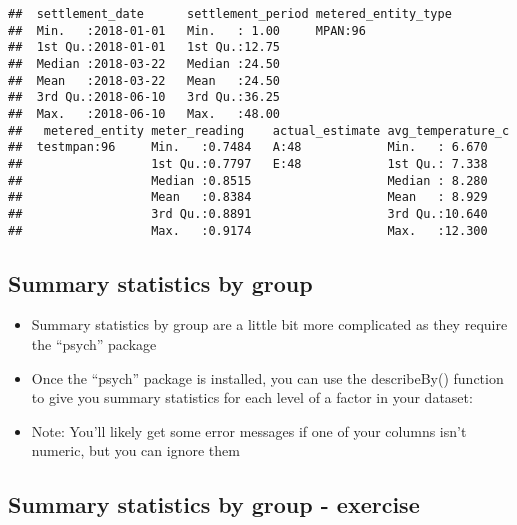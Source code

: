 \documentclass[]{article}
\newenvironment{Shaded}{\begin{snugshade}}{\end{snugshade}}
\newcommand{\KeywordTok}[1]{\textcolor[rgb]{0.13,0.29,0.53}{\textbf{#1}}}
\newcommand{\OperatorTok}[1]{\textcolor[rgb]{0.81,0.36,0.00}{\textbf{#1}}}
\newcommand{\NormalTok}[1]{#1}
\providecommand{\tightlist}{%
  \setlength{\itemsep}{0pt}\setlength{\parskip}{0pt}}
\begin{document}
\begin{verbatim}
##  settlement_date      settlement_period metered_entity_type
##  Min.   :2018-01-01   Min.   : 1.00     MPAN:96            
##  1st Qu.:2018-01-01   1st Qu.:12.75                        
##  Median :2018-03-22   Median :24.50                        
##  Mean   :2018-03-22   Mean   :24.50                        
##  3rd Qu.:2018-06-10   3rd Qu.:36.25                        
##  Max.   :2018-06-10   Max.   :48.00                        
##   metered_entity meter_reading    actual_estimate avg_temperature_c
##  testmpan:96     Min.   :0.7484   A:48            Min.   : 6.670   
##                  1st Qu.:0.7797   E:48            1st Qu.: 7.338   
##                  Median :0.8515                   Median : 8.280   
##                  Mean   :0.8384                   Mean   : 8.929   
##                  3rd Qu.:0.8891                   3rd Qu.:10.640   
##                  Max.   :0.9174                   Max.   :12.300
\end{verbatim}

\subsection{Summary statistics by
group}\label{summary-statistics-by-group}

\begin{itemize}
\tightlist
\item
  Summary statistics by group are a little bit more complicated as they
  require the ``psych'' package
\item
  Once the ``psych'' package is installed, you can use the describeBy()
  function to give you summary statistics for each level of a factor in
  your dataset:
\item
  Note: You'll likely get some error messages if one of your columns
  isn't numeric, but you can ignore them
\end{itemize}

\begin{Shaded}
\end{Shaded}

\subsection{Summary statistics by group -
exercise}\label{summary-statistics-by-group---exercise}
\end{document}
